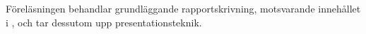 Föreläsningen behandlar grundläggande rapportskrivning, motsvarande innehållet 
i \cite{MiUn2012rft}, och tar dessutom upp presentationsteknik.
